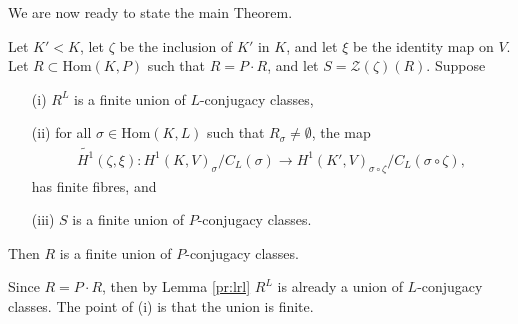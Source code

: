 We are now ready to state the main Theorem.

\begin{theorem}\label{main_thm} Let $K'<K$, let $\zeta$ be the inclusion of $K'$ in $K$, and let $\xi$ be the identity map on $V$. Let $R \subset \mathrm{Hom}(K, P)$ such that $R = P \cdot R$, and let $S = \mathcal{Z}(\zeta)(R)$. Suppose
	\begin{itemize}
		\item[(i)] $R^L$ is a finite union of $L$-conjugacy classes,
		\item[(ii)] for all $\sigma \in \mathrm{Hom}(K, L)$ such that $R_\sigma \neq \emptyset$, the map
			\begin{align*}
				\widetilde{H^1}(\zeta, \xi):H^1(K, V)_\sigma/C_L(\sigma) \rightarrow H^1(K', V)_{\sigma\circ\zeta}/C_L(\sigma\circ\zeta),
			\end{align*}
			has finite fibres, and
		\item[(iii)] $S$ is a finite union of $P$-conjugacy classes.
	\end{itemize}
	Then $R$ is a finite union of $P$-conjugacy classes.
\end{theorem}
\begin{remark}
	Since $R = P \cdot R$, then by Lemma \ref{pr:lrl} $R^L$ is already a union of $L$-conjugacy classes. The point of (i) is that the union is finite.
\end{remark}
